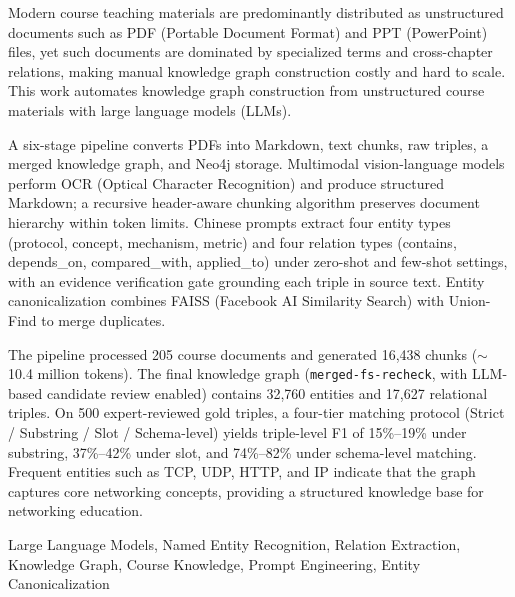 \abstracten

Modern course teaching materials are predominantly distributed as unstructured documents such as PDF (Portable Document Format) and PPT (PowerPoint) files, yet such documents are dominated by specialized terms and cross-chapter relations, making manual knowledge graph construction costly and hard to scale. This work automates knowledge graph construction from unstructured course materials with large language models (LLMs).

A six-stage pipeline converts PDFs into Markdown, text chunks, raw triples, a merged knowledge graph, and Neo4j storage. Multimodal vision-language models perform OCR (Optical Character Recognition) and produce structured Markdown; a recursive header-aware chunking algorithm preserves document hierarchy within token limits. Chinese prompts extract four entity types (protocol, concept, mechanism, metric) and four relation types (contains, depends\_on, compared\_with, applied\_to) under zero-shot and few-shot settings, with an evidence verification gate grounding each triple in source text. Entity canonicalization combines FAISS (Facebook AI Similarity Search) with Union-Find to merge duplicates.

The pipeline processed 205 course documents and generated 16,438 chunks ($\sim$10.4 million tokens). The final knowledge graph (\texttt{merged-fs-recheck}, with LLM-based candidate review enabled) contains 32,760 entities and 17,627 relational triples. On 500 expert-reviewed gold triples, a four-tier matching protocol (Strict / Substring / Slot / Schema-level) yields triple-level F1 of 15\%--19\% under substring, 37\%--42\% under slot, and 74\%--82\% under schema-level matching. Frequent entities such as TCP, UDP, HTTP, and IP indicate that the graph captures core networking concepts, providing a structured knowledge base for networking education.

\vspace{\baselineskip}

\keywordsen Large Language Models, Named Entity Recognition, Relation Extraction, Knowledge Graph, Course Knowledge, Prompt Engineering, Entity Canonicalization
